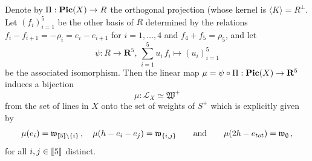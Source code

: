\documentclass[11pt]{amsart}
\begin{document}
Denote by $\Pi: {\bf Pic}(X)\rightarrow R$  the orthogonal projection (whose kernel is $\langle K\rangle =R^\perp$.  Let $(f_i)_{i=1}^5$ be the other basis of $R$ determined by the relations 
$f_i-f_{i+1}=-\rho_i=e_i-e_{i+1}$ for $i=1,\ldots,4$ and $f_4+f_5=\rho_5$, and let 
\begin{equation}
\label{Eq:psi}
 \psi : R\longrightarrow \mathbf R^5,\, 
 \sum_{i=1}^5 u_i\,f_i\longmapsto 
 (u_i)_{i=1}^5
\end{equation}
be the associated isomorphism. 
Then the linear map $ \mu=\psi\circ \Pi :  {\bf Pic}(X)\rightarrow  \mathbf R^5$
 induces a bijection 
 \begin{equation}
 \label{Eq:bijection-mu}
 \mu : \mathcal L_X \simeq  \mathfrak W^+
 \end{equation}
  from the set of lines in $X$ 
onto the set of weights of $S^+$ which is explicitly given  by
  $$
 \mu(e_i)=\mathfrak w_{[\hspace{-0.05cm}[5]\hspace{-0.05cm}] \setminus \{i\}}  
 \, , \quad 
  \mu(h-e_i-e_j)=\mathfrak w_{ \{i,j\}} 
 \qquad \mbox{and} \qquad 
 \mu(2h-e_{tot})=\mathfrak w_{\emptyset}\, , 
 $$
for all $i,j\in [\hspace{-0.05cm}[5]\hspace{-0.05cm}]$ distinct.
\end{document}
